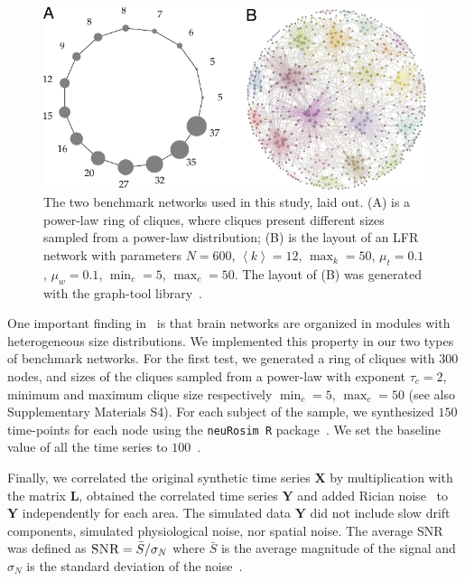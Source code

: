 \begin{figure}[!ht]
\includegraphics[width=1\textwidth]{images/lfrringclique.pdf}
\caption{The two benchmark networks used in this study, laid out. (A) is a power-law ring of cliques, where cliques present different sizes sampled from a power-law distribution;
(B) is the layout of an LFR network with parameters $N=600$, $\left< k \right>=12$,  $\max_k=50$, $\mu_t=0.1$, $\mu_w=0.1$, $\min_c=5$, $\max_c=50$.
The layout of (B) was generated with the graph-tool library~\cite{peixoto_graph_tool_2014}.}
\label{fig:lfrringclique}
\end{figure}

One important finding in~\cite{nicolini2016} is that brain networks are organized in modules with heterogeneous size distributions.
We implemented this property in our two types of benchmark networks.
For the first test, we generated a ring of cliques with $300$ nodes, and sizes of the cliques sampled from a power-law with exponent $\tau_c=2$, minimum and maximum clique size respectively $\min_c=5$, $\max_c=50$ (see also Supplementary Materials S4).
For each subject of the sample, we synthesized $150$ time-points for each node using the \texttt{neuRosim R} package~\cite{neurosim2011}. We set the baseline value of all the time series to $100$~\cite{welvaert2013}.

Finally, we correlated the original synthetic time series $\mathbf{X}$ by multiplication with the matrix $\mathbf{L}$, obtained the correlated time series $\mathbf{Y}$ and added Rician noise~\cite{gudbjartsson1995} to $\mathbf{Y}$ independently for each area. The simulated data $\mathbf{Y}$ did not include slow drift components, simulated physiological noise, nor spatial noise. The average SNR was defined as $\textsc{SNR}=\bar{S}/\sigma_N$ where $\bar{S}$ is the average magnitude of the signal and $\sigma_N$ is the standard deviation of the noise~\cite{kruger2011}.

